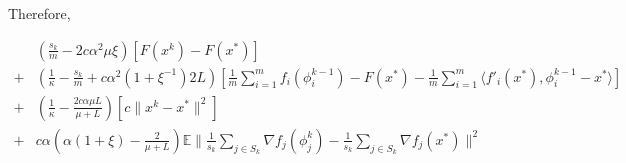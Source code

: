 \documentclass[11pt]{article}
\begin{document}
Therefore, 

\begin{align*}
	& \left( \frac{s_k}{m}   - 2c \alpha^2 \mu \xi\right) \left[   F(x^k) - F(x^*)  \right] \\
	+& \left( \frac{1}{\kappa} - \frac{s_k}{m} + c \alpha^2 (1+\xi^{-1}) 2L\right) \left[ \frac{1}{m}\sum_{i =1}^{m}  f_i(\phi_i^{k-1})   - F(x^*)  -\frac{1}{m}\sum_{i =1}^{m}   \langle f'_i(x^*), \phi_i^{k-1} - x^*\rangle \right] \\
	+& \left( \frac{1}{\kappa} -\frac{ 2c \alpha \mu L}{\mu+L}\right) \left[ c \|x^k - x^* \|^2 \right] \\
	+&c \alpha( \alpha (1+\xi)-\frac{ 2 }{\mu+L}) \mathbb{E} \| \frac{1}{s_k} \sum_{j \in S_k}  \nabla f_j(\phi_j^{k}) - \frac{ 1}{s_k} \sum_{j \in S_k}  \nabla f_j(x^*)\|^2    \\
\end{align*}
\end{document}
